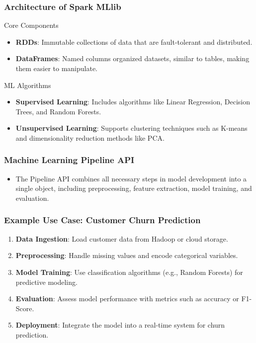 \documentclass[aspectratio=169]{beamer}
\begin{document}
\begin{frame}[fragile]
    \frametitle{Architecture of Spark MLlib}
    \begin{block}{Core Components}
        \begin{itemize}
            \item \textbf{RDDs}: Immutable collections of data that are fault-tolerant and distributed.
            \item \textbf{DataFrames}: Named columns organized datasets, similar to tables, making them easier to manipulate.
        \end{itemize}
    \end{block}

    \begin{block}{ML Algorithms}
        \begin{itemize}
            \item \textbf{Supervised Learning}: Includes algorithms like Linear Regression, Decision Trees, and Random Forests.
            \item \textbf{Unsupervised Learning}: Supports clustering techniques such as K-means and dimensionality reduction methods like PCA.
        \end{itemize}
    \end{block}
\end{frame}

\begin{frame}[fragile]
    \frametitle{Machine Learning Pipeline API}
    \begin{itemize}
        \item The Pipeline API combines all necessary steps in model development into a single object, including preprocessing, feature extraction, model training, and evaluation.
    \end{itemize}
\end{frame}

\begin{frame}[fragile]
    \frametitle{Example Use Case: Customer Churn Prediction}
    \begin{enumerate}
        \item \textbf{Data Ingestion}: Load customer data from Hadoop or cloud storage.
        \item \textbf{Preprocessing}: Handle missing values and encode categorical variables.
        \item \textbf{Model Training}: Use classification algorithms (e.g., Random Forests) for predictive modeling.
        \item \textbf{Evaluation}: Assess model performance with metrics such as accuracy or F1-Score.
        \item \textbf{Deployment}: Integrate the model into a real-time system for churn prediction.
    \end{enumerate}
\end{frame}
\end{document}
